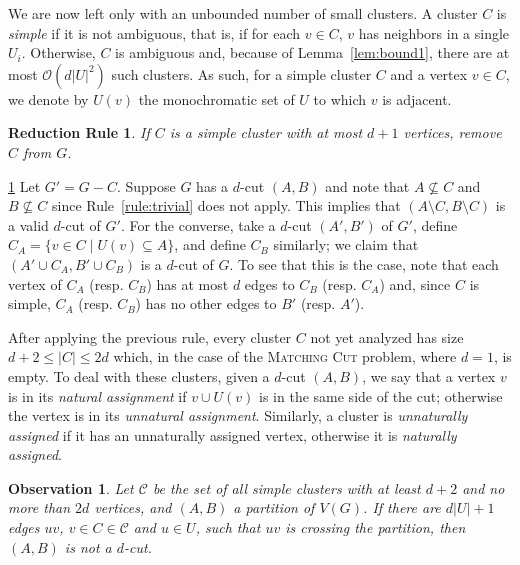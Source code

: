 \documentclass[a4paper,UKenglish,cleveref, autoref]{lipics-v2019}
\newtheorem{rrule}{Reduction Rule}
\newtheorem{observation}{Observation}
\newcommand{\bigO}[1]{\mathcal{O}\!\left(#1\right)}
\newcommand{\pname}[1]{\textsc{#1}}
\newcommand{\tdef}[1]{\emph{#1}}
\begin{document}
We are now left only with an unbounded number of small clusters.
A cluster $C$ is \tdef{simple} if it is not ambiguous, that is, if for each $v \in C$, $v$ has neighbors in a single $U_i$.
Otherwise, $C$ is ambiguous and, because of Lemma~\ref{lem:bound1}, there are at most $\bigO{d|U|^2}$ such clusters.
As such, for a simple cluster $C$ and a vertex $v \in C$, we denote by $U(v)$ the monochromatic set of $U$ to which $v$ is adjacent.

\begin{rrule}
    \label{rule:super_small}
    If $C$ is a simple cluster with at most $d+1$ vertices, remove $C$ from $G$.
\end{rrule}

\begin{sproof}{\ref{rule:super_small}}
    Let $G' = G - C$.
    Suppose $G$ has a $d$-cut $(A,B)$ and note that $A \nsubseteq C$ and $B \nsubseteq C$ since Rule~\ref{rule:trivial} does not apply.
    This implies that $(A \setminus C, B \setminus C)$ is a valid $d$-cut of $G'$.
    For the converse, take a $d$-cut $(A', B')$ of $G'$, define $C_A = \{v \in C \mid U(v) \subseteq A\}$, and define $C_B$ similarly; we claim that $(A' \cup C_A, B' \cup C_B)$ is a $d$-cut of $G$.
    To see that this is the case, note that each vertex of $C_A$ (resp. $C_B$) has at most $d$ edges to $C_B$ (resp. $C_A$) and, since $C$ is simple, $C_A$ (resp. $C_B$) has no other edges to $B'$ (resp. $A'$).
\end{sproof}

After applying the previous rule, every cluster $C$ not yet analyzed has size $d+2 \leq |C| \leq 2d$ which, in the case of the \pname{Matching Cut} problem, where $d=1$, is empty.
To deal with these clusters, given a $d$-cut $(A, B)$, we say that a vertex $v$ is in its \tdef{natural assignment} if $v \cup U(v)$ is in the same side of the cut; otherwise the vertex is in its \tdef{unnatural assignment}.
Similarly, a cluster is \tdef{unnaturally assigned} if it has an unnaturally assigned vertex, otherwise it is \tdef{naturally assigned}.

\begin{observation}
    \label{obs:constrained_unnatural}
    Let $\mathcal{C}$ be the set of all simple clusters with at least $d+2$ and no more than $2d$ vertices, and $(A,B)$ a partition of $V(G)$.
    If there are $d|U|+1$ edges $uv$, $v \in C \in \mathcal{C}$ and $u \in U$, such that $uv$ is crossing the partition, then $(A,B)$ is not a $d$-cut.
\end{observation}
\end{document}
